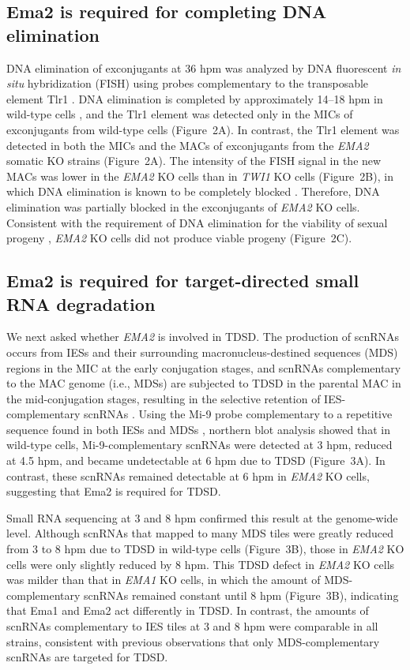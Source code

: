 \documentclass[11pt]{article}
\begin{document}
\subsection{Ema2 is required for completing DNA elimination}

DNA elimination of exconjugants at 36 hpm was analyzed by DNA fluorescent \textit{in situ} hybridization (FISH) using probes complementary to the transposable element Tlr1 \citep{wuitschick2002}. DNA elimination is completed by approximately 14--18 hpm in wild-type cells \citep{austerberry1984,mutazono2019}, and the Tlr1 element was detected only in the MICs of exconjugants from wild-type cells (Figure~2A). In contrast, the Tlr1 element was detected in both the MICs and the MACs of exconjugants from the \textit{EMA2} somatic KO strains \citep{shehzada2022} (Figure~2A). The intensity of the FISH signal in the new MACs was lower in the \textit{EMA2} KO cells than in \textit{TWI1} KO cells (Figure~2B), in which DNA elimination is known to be completely blocked \citep{noto2015}. Therefore, DNA elimination was partially blocked in the exconjugants of \textit{EMA2} KO cells. Consistent with the requirement of DNA elimination for the viability of sexual progeny \citep{cheng2010,vogt2013}, \textit{EMA2} KO cells did not produce viable progeny (Figure~2C).

\subsection{Ema2 is required for target-directed small RNA degradation}

We next asked whether \textit{EMA2} is involved in TDSD. The production of scnRNAs occurs from IESs and their surrounding macronucleus-destined sequences (MDS) regions in the MIC at the early conjugation stages, and scnRNAs complementary to the MAC genome (i.e., MDSs) are subjected to TDSD in the parental MAC in the mid-conjugation stages, resulting in the selective retention of IES-complementary scnRNAs \citep{schoeberl2012}. Using the Mi-9 probe complementary to a repetitive sequence found in both IESs and MDSs \citep{aronica2008study}, northern blot analysis showed that in wild-type cells, Mi-9-complementary scnRNAs were detected at 3 hpm, reduced at 4.5 hpm, and became undetectable at 6 hpm due to TDSD (Figure~3A). In contrast, these scnRNAs remained detectable at 6 hpm in \textit{EMA2} KO cells, suggesting that Ema2 is required for TDSD.

Small RNA sequencing at 3 and 8 hpm confirmed this result at the genome-wide level. Although scnRNAs that mapped to many MDS tiles were greatly reduced from 3 to 8 hpm due to TDSD in wild-type cells (Figure~3B), those in \textit{EMA2} KO cells were only slightly reduced by 8 hpm. This TDSD defect in \textit{EMA2} KO cells was milder than that in \textit{EMA1} KO cells, in which the amount of MDS-complementary scnRNAs remained constant until 8 hpm (Figure~3B), indicating that Ema1 and Ema2 act differently in TDSD. In contrast, the amounts of scnRNAs complementary to IES tiles at 3 and 8 hpm were comparable in all strains, consistent with previous observations that only MDS-complementary scnRNAs are targeted for TDSD.
\end{document}
